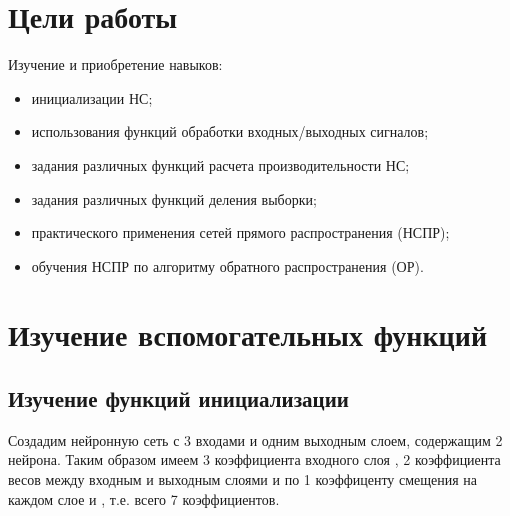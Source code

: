 





\tableofcontents
\listoffigures
\newpage

\section{Цели работы}

Изучение и приобретение навыков:
\begin{itemize}
	\item инициализации НС;
	\item использования функций обработки входных/выходных сигналов;
	\item задания различных функций расчета производительности НС;
	\item задания различных функций деления выборки;
	\item практического применения сетей прямого распространения (НСПР);
	\item обучения НСПР по алгоритму обратного распространения (ОР).
\end{itemize}

\section{Изучение вспомогательных функций}

\subsection{Изучение функций инициализации}


Создадим нейронную сеть с 3 входами и одним выходным слоем, содержащим 2 нейрона. Таким образом имеем 3 коэффициента входного слоя , 2 коэффициента весов между входным и выходным слоями  и по 1 коэффиценту смещения на каждом слое  и , т.е. всего 7 коэффициентов.

